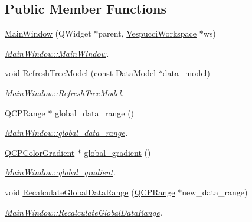 \subsection*{Public Member Functions}
\begin{DoxyCompactItemize}
\item 
\hyperlink{class_main_window_ab87cdab2f1b7c709fc0f8bca4cf09ebc}{Main\+Window} (Q\+Widget $\ast$parent, \hyperlink{class_vespucci_workspace}{Vespucci\+Workspace} $\ast$ws)
\begin{DoxyCompactList}\small\item\em \hyperlink{class_main_window_ab87cdab2f1b7c709fc0f8bca4cf09ebc}{Main\+Window\+::\+Main\+Window}. \end{DoxyCompactList}\item 
void \hyperlink{class_main_window_ae0b7da69481267797f68f1d12d1fdedf}{Refresh\+Tree\+Model} (const \hyperlink{class_data_model}{Data\+Model} $\ast$data\+\_\+model)
\begin{DoxyCompactList}\small\item\em \hyperlink{class_main_window_ae0b7da69481267797f68f1d12d1fdedf}{Main\+Window\+::\+Refresh\+Tree\+Model}. \end{DoxyCompactList}\item 
\hyperlink{class_q_c_p_range}{Q\+C\+P\+Range} $\ast$ \hyperlink{class_main_window_a89e2dbed5fa59653909d8cd2195c67be}{global\+\_\+data\+\_\+range} ()
\begin{DoxyCompactList}\small\item\em \hyperlink{class_main_window_a89e2dbed5fa59653909d8cd2195c67be}{Main\+Window\+::global\+\_\+data\+\_\+range}. \end{DoxyCompactList}\item 
\hyperlink{class_q_c_p_color_gradient}{Q\+C\+P\+Color\+Gradient} $\ast$ \hyperlink{class_main_window_abe4c08852fad9c895a712dcd22ac9bd5}{global\+\_\+gradient} ()
\begin{DoxyCompactList}\small\item\em \hyperlink{class_main_window_abe4c08852fad9c895a712dcd22ac9bd5}{Main\+Window\+::global\+\_\+gradient}. \end{DoxyCompactList}\item 
void \hyperlink{class_main_window_a58206491beb13daf24f3ba72e5eebbc0}{Recalculate\+Global\+Data\+Range} (\hyperlink{class_q_c_p_range}{Q\+C\+P\+Range} $\ast$new\+\_\+data\+\_\+range)
\begin{DoxyCompactList}\small\item\em \hyperlink{class_main_window_a58206491beb13daf24f3ba72e5eebbc0}{Main\+Window\+::\+Recalculate\+Global\+Data\+Range}. \end{DoxyCompactList}\item 

\end{DoxyCompactItemize}

